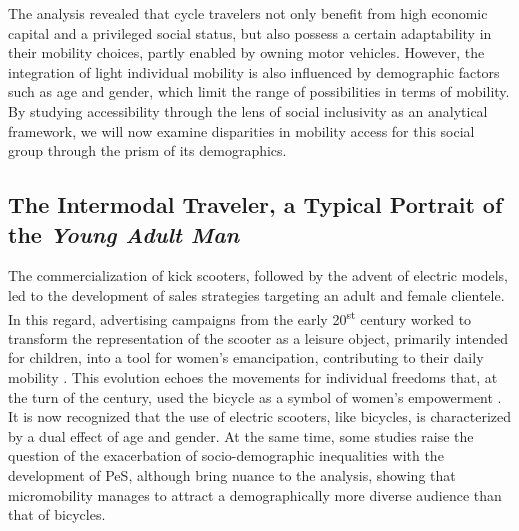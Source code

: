 \begin{refsegment}
The analysis revealed that cycle travelers not only benefit from high economic capital and a privileged social status, but also possess a certain adaptability in their mobility choices, partly enabled by owning motor vehicles. However, the integration of light individual mobility is also influenced by demographic factors such as age and gender, which limit the range of possibilities in terms of mobility. By studying accessibility through the lens of social inclusivity as an analytical framework, we will now examine disparities in mobility access for this social group through the prism of its demographics.%

\subsection{The Intermodal Traveler, a Typical Portrait of the \textsl{Young Adult Man}
    \label{chap4:demographie}
    }

The commercialization of kick scooters, followed by the advent of electric models, led to the development of sales strategies targeting an adult and female clientele. In this regard, advertising campaigns from the early 20\textsuperscript{st} century worked to transform the representation of the scooter as a leisure object, primarily intended for children, into a tool for women's emancipation, contributing to their daily mobility \textcolor{blue}{\autocite{hemmings_look_2011}}. This evolution echoes the movements for individual freedoms that, at the turn of the century, used the bicycle as a symbol of women's empowerment \textcolor{blue}{\autocite[187]{heran_retour_2015}}. It is now recognized that the use of electric scooters, like bicycles, is characterized by a dual effect of age and gender. At the same time, some studies raise the question of the exacerbation of socio-demographic inequalities with the development of \acrshort{PeS}, although \textcolor{blue}{\textcite[12]{curl_same_2020}} bring nuance to the analysis, showing that micromobility manages to attract a demographically more diverse audience than that of bicycles.%


\end{refsegment}
